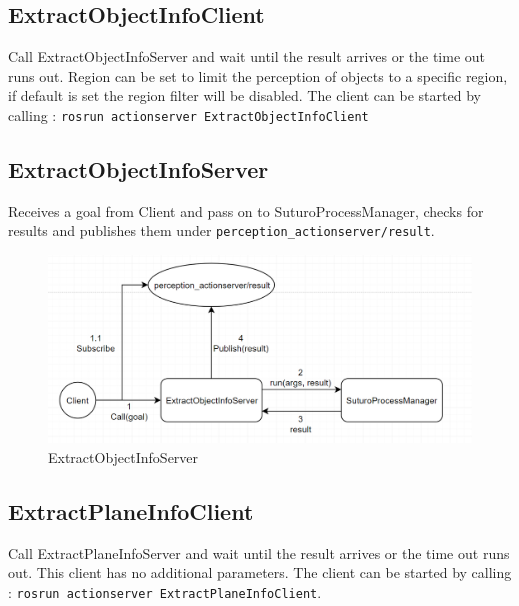 \documentclass[main.tex]{subfiles}
\begin{document}
			\subsection{ExtractObjectInfoClient}
Call ExtractObjectInfoServer and wait until the result arrives or the time out runs out. Region can be set to limit the perception of objects to a specific region, if default is set the region filter will be disabled. The client can be started by calling : \texttt{rosrun actionserver ExtractObjectInfoClient}

			\subsection{ExtractObjectInfoServer}
Receives a goal from Client and pass on to SuturoProcessManager, checks for results and publishes them under \texttt{perception\_actionserver/result}. 
			\begin{figure}[H]
   			 \centering
    			 \includegraphics[width=1\textwidth]{pictures/perception/suturo_ExtractObjectInfoServer.png}
   			 \caption{ExtractObjectInfoServer}
  			\end{figure}

			\subsection{ExtractPlaneInfoClient}
Call ExtractPlaneInfoServer and wait until the result arrives or the time out runs out. This client has no additional parameters.
The client can be started by calling : \texttt{rosrun actionserver ExtractPlaneInfoClient}.
\end{document}
